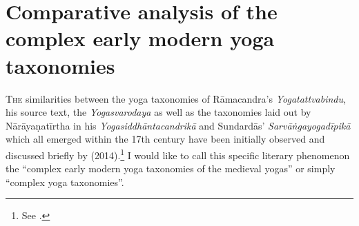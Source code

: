 \chapter{Comparative analysis of the complex early modern yoga taxonomies}
\label{yogas_list}
\label{yogatax}
\clearpage







\noindent
\lettrine[lines=2, lhang=0.2, loversize=0.25]{T}{he} similarities between the yoga taxonomies of Rāmacandra's \textit{Yogatattvabindu}, his source text, the \textit{Yogasvarodaya} as well as the taxonomies laid out by Nārāyaṇatīrtha in his \textit{Yogasiddhāntacandrikā} and Sundardās' \textit{Sarvāṅgayogadīpikā} which all emerged within the 17th century have been initially observed and discussed briefly by \citeauthor{birch2014} (2014).\footnote{See \citeauthor[2014: 415-416]{birch2014}.} I would like to call this specific literary phenomenon the ``complex early modern yoga taxonomies of the medieval yogas'' or simply ``complex yoga taxonomies''.

